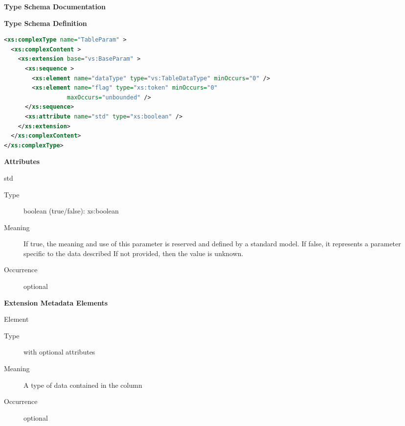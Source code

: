\documentclass[11pt,a4paper]{ivoa}
\begin{document}
\begin{generated}
\begingroup
        \renewcommand*\descriptionlabel[1]{%
        \hbox to 5.5em{\emph{#1}\hfil}}\vspace{2ex}\noindent\textbf{ Type Schema Documentation}


\vspace{1ex}\noindent\textbf{ Type Schema Definition}

\begin{lstlisting}[language=XML,basicstyle=\footnotesize]
<xs:complexType name="TableParam" >
  <xs:complexContent >
    <xs:extension base="vs:BaseParam" >
      <xs:sequence >
        <xs:element name="dataType" type="vs:TableDataType" minOccurs="0" />
        <xs:element name="flag" type="xs:token" minOccurs="0"
                  maxOccurs="unbounded" />
      </xs:sequence>
      <xs:attribute name="std" type="xs:boolean" />
    </xs:extension>
  </xs:complexContent>
</xs:complexType>
\end{lstlisting}

\vspace{0.5ex}\noindent\textbf{ Attributes}

\begingroup\small\begin{bigdescription}
\item[std]
\begin{description}
\item[Type] boolean (true/false): xs:boolean
\item[Meaning] If true, the meaning and use of this parameter is
                     reserved and defined by a standard model.  If false,
                     it represents a parameter specific to the data described
                     If not provided, then the value is unknown.
\item[Occurrence] optional
\end{description}


\end{bigdescription}\endgroup



\vspace{0.5ex}\noindent\textbf{ Extension Metadata Elements}

\begingroup\small\begin{bigdescription}\item[Element \xmlel{dataType}]
\begin{description}
\item[Type]  with optional attributes
\item[Meaning] A type of data contained in the column
\item[Occurrence] optional


\end{description}
\end{bigdescription}
\end{generated}
\end{document}
